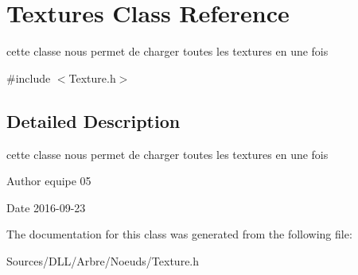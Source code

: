 \hypertarget{class_textures}{}\section{Textures Class Reference}
\label{class_textures}


cette classe nous permet de charger toutes les textures en une fois  




{\ttfamily \#include $<$Texture.\+h$>$}



\subsection{Detailed Description}
cette classe nous permet de charger toutes les textures en une fois 

\begin{DoxyAuthor}{Author}
equipe 05 
\end{DoxyAuthor}
\begin{DoxyDate}{Date}
2016-\/09-\/23 
\end{DoxyDate}


The documentation for this class was generated from the following file\+:\begin{DoxyCompactItemize}
\item 
Sources/\+D\+L\+L/\+Arbre/\+Noeuds/Texture.\+h\end{DoxyCompactItemize}
